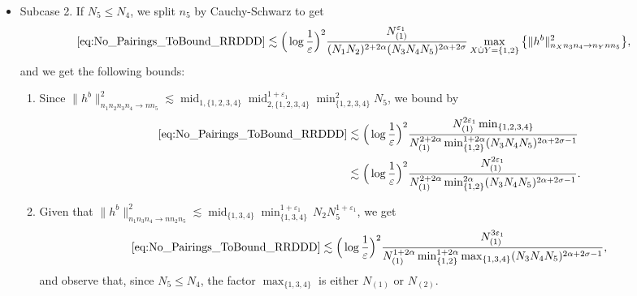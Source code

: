 \documentclass[11pt, xcolor = dvipsnames,reqno
]{amsart}
\theoremstyle{definition}
\theoremstyle{remark}
\begin{document}
\begin{itemize}
Thus, in all cases, with probability $\geq 1 - \varepsilon$ we get at least
\begin{equation}
    \eqref{eq:No_Pairings_ToBound_RRDDD} 
    \lesssim \Big(\log \frac{1}{\varepsilon}\Big)^2 \frac{N_{(1)}^{3\varepsilon_1}}{N_{(1)}^{1 + 2\alpha} N_{(2)}  (N_{(3)}N_{(4)}N_{(5)})^{2 \alpha + 2 \sigma - 1}}.
\end{equation}

\item Subcase 2. If $N_5 \leq N_4$, we split $n_5$ by Cauchy-Schwarz to get
\begin{align}
    \eqref{eq:No_Pairings_ToBound_RRDDD}
    & \lesssim  \Big(\log \frac{1}{\varepsilon} \Big)^2
    \frac{N_{(1)}^{\varepsilon_1}}{(N_1N_2)^{2 + 2\alpha} (N_3N_4N_5)^{2\alpha + 2\sigma}}
    \max_{X \dot{\cup} Y = \{1,2\}} \big\{
    \lVert  h^b \rVert_{n_Xn_3n_4 \to n_Ynn_5}^2
    \big\}, 
\end{align}
and we get the following bounds:
\begin{enumerate}
    \item Since $\lVert  h^b \rVert_{n_1n_2n_3n_4 \to nn_5}^2
    \lesssim \operatorname{mid}_{1,\{1,2,3,4\}} \operatorname{mid}_{2,\{1,2,3,4\}}^{1 + \varepsilon_1} \operatorname{min}_{\{1,2,3,4\}}^2 N_5$,  we bound by
    \begin{align*}
        \eqref{eq:No_Pairings_ToBound_RRDDD} &\lesssim \Big(\log \frac{1}{\varepsilon} \Big)^2
    \frac{N_{(1)}^{2\varepsilon_1} \operatorname{min}_{\{1,2,3,4\}}}{N_{(1)}^{2 + 2\alpha} \min_{\{1,2\}}^{1 + 2\alpha}(N_3N_4N_5)^{2 \alpha + 2\sigma - 1}} \\
    &\lesssim \Big(\log \frac{1}{\varepsilon} \Big)^2
    \frac{N_{(1)}^{2\varepsilon_1}}{N_{(1)}^{2 + 2\alpha} \min_{\{1,2\}}^{2\alpha}(N_3N_4N_5)^{2 \alpha + 2\sigma - 1}}.
    \end{align*}
    
    \item Given that $\lVert  h^b \rVert_{n_1n_3n_4 \to nn_2n_5}^2
    \lesssim 
    \operatorname{mid}_{\{1,3,4\}} \min_{\{1,3,4\}}^{1+\varepsilon_1} \, N_2 N_5^{1+\varepsilon_1}$, we get
    \begin{align*}
        \eqref{eq:No_Pairings_ToBound_RRDDD} \lesssim \Big(\log \frac{1}{\varepsilon} \Big)^2 \frac{N_{(1)}^{3\varepsilon_1}}{N_{(1)}^{1 + 2\alpha} \min_{\{1,2\}}^{1 + 2\alpha}\max_{\{1,3,4\}}(N_3N_4N_5)^{2 \alpha + 2\sigma - 1}}, 
    \end{align*}
    and observe that, since $N_5 \leq N_4$, 
    the factor $\max_{\{1,3,4\}}$ is either $N_{(1)}$ or $N_{(2)}$. 
    

\end{enumerate}
\end{itemize}
\end{document}
